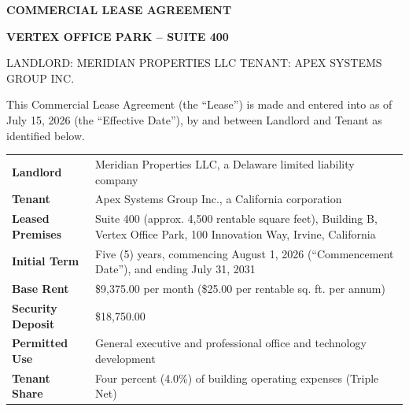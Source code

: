 \documentclass[11pt,letterpaper]{article}
\begin{document}
\begin{leaseheader}
    {\color{white}\Huge\bfseries\sffamily COMMERCIAL LEASE AGREEMENT\par}
    \vspace{8pt}
    {\color{accent}\large\bfseries VERTEX OFFICE PARK -- SUITE 400\par}
    \vspace{8pt}
    {\color{white}\footnotesize LANDLORD: MERIDIAN PROPERTIES LLC \hfill TENANT: APEX SYSTEMS GROUP INC.}
\end{leaseheader}

\vspace{15pt}

\noindent This Commercial Lease Agreement (the ``Lease'') is made and entered into as of July 15, 2026 (the ``Effective Date''), by and between Landlord and Tenant as identified below.

\vspace{15pt}

\begin{tcolorbox}[
    enhanced,
    colback=bglight,
    colframe=secondary,
    arc=0mm,
    boxrule=1pt,
    title={\sffamily\bfseries\color{white} KEY LEASE TERMS \& REFERENCE SUMMARY},
    toptitle=8pt,
    bottomtitle=8pt,
    left=15pt,
    right=15pt,
    top=10pt,
    bottom=10pt
]
\renewcommand{\arraystretch}{1.4}
\begin{tabularx}{\textwidth}{@{} >{\bfseries\color{primary}}l X @{}}
    Landlord & Meridian Properties LLC, a Delaware limited liability company \\
    Tenant & Apex Systems Group Inc., a California corporation \\
    Leased Premises & Suite 400 (approx. 4,500 rentable square feet), Building B, Vertex Office Park, 100 Innovation Way, Irvine, California \\
    Initial Term & Five (5) years, commencing August 1, 2026 (``Commencement Date''), and ending July 31, 2031 \\
    Base Rent & \$9,375.00 per month (\$25.00 per rentable sq. ft. per annum) \\
    Security Deposit & \$18,750.00 \\
    Permitted Use & General executive and professional office and technology development \\
    Tenant Share & Four percent (4.0\%) of building operating expenses (Triple Net)
\end{tabularx}
\end{tcolorbox}

\vspace{10pt}










\end{document}
